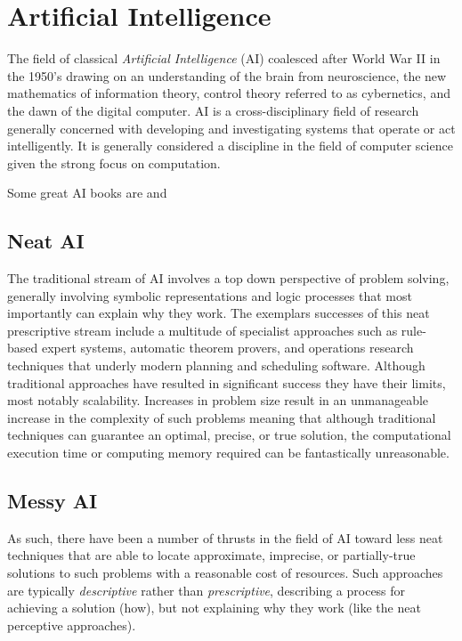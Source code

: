\documentclass[a4paper, 11pt]{article}
\begin{document}
% 
% 
\section{Artificial Intelligence}
\label{sec:artificial_intelligence}
The field of classical \emph{Artificial Intelligence} (AI) coalesced after World War II in the 1950's drawing on an understanding of the brain from neuroscience, the new mathematics of information theory, control theory referred to as cybernetics, and the dawn of the digital computer. AI is a cross-disciplinary field of research generally concerned with developing and investigating systems that operate or act intelligently. It is generally considered a discipline in the field of computer science given the strong focus on computation.

Some great AI books are \cite{Russell2009} and \cite{Luger1993}

\subsection{Neat AI}
The traditional stream of AI involves a top down perspective of problem solving, generally involving symbolic representations and logic processes that most importantly can explain why they work. The exemplars successes of this neat prescriptive stream include a multitude of specialist approaches such as rule-based expert systems, automatic theorem provers, and operations research techniques that underly modern planning and scheduling software. Although traditional approaches have resulted in significant success they have their limits, most notably scalability. Increases in problem size result in an unmanageable increase in the complexity of such problems meaning that although traditional techniques can guarantee an optimal, precise, or true solution, the computational execution time or computing memory required can be fantastically unreasonable.

\subsection{Messy AI}
As such, there have been a number of thrusts in the field of AI toward less neat techniques that are able to locate approximate, imprecise, or partially-true solutions to such problems with a reasonable cost of resources. Such approaches are typically \emph{descriptive} rather than \emph{prescriptive}, describing a process for achieving a solution (how), but not explaining why they work (like the neat perceptive approaches). 
\end{document}
